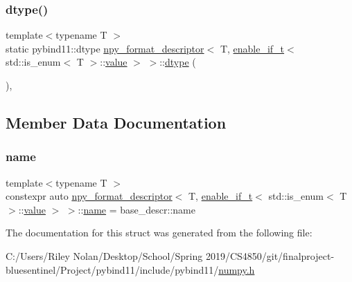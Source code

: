 \subsubsection{\texorpdfstring{dtype()}{dtype()}}
{\footnotesize\ttfamily template$<$typename T $>$ \\
static pybind11\+::dtype \mbox{\hyperlink{structnpy__format__descriptor}{npy\+\_\+format\+\_\+descriptor}}$<$ T, \mbox{\hyperlink{detail_2common_8h_a012819c9e8b5e04872a271f50f8b8196}{enable\+\_\+if\+\_\+t}}$<$ std\+::is\+\_\+enum$<$ T $>$\+::\mbox{\hyperlink{_s_d_l__opengl__glext_8h_a8ad81492d410ff2ac11f754f4042150f}{value}} $>$ $>$\+::\mbox{\hyperlink{classdtype}{dtype}} (\begin{DoxyParamCaption}{ }\end{DoxyParamCaption})\hspace{0.3cm}{\ttfamily [inline]}, {\ttfamily [static]}}



\subsection{Member Data Documentation}
\mbox{\label{structnpy__format__descriptor_3_01_t_00_01enable__if__t_3_01std_1_1is__enum_3_01_t_01_4_1_1value_01_4_01_4_a22bcbb11a0d4d204723ffdf2844b4b32}} 
\subsubsection{\texorpdfstring{name}{name}}
{\footnotesize\ttfamily template$<$typename T $>$ \\
constexpr auto \mbox{\hyperlink{structnpy__format__descriptor}{npy\+\_\+format\+\_\+descriptor}}$<$ T, \mbox{\hyperlink{detail_2common_8h_a012819c9e8b5e04872a271f50f8b8196}{enable\+\_\+if\+\_\+t}}$<$ std\+::is\+\_\+enum$<$ T $>$\+::\mbox{\hyperlink{_s_d_l__opengl__glext_8h_a8ad81492d410ff2ac11f754f4042150f}{value}} $>$ $>$\+::\mbox{\hyperlink{structname}{name}} = base\+\_\+descr\+::name\hspace{0.3cm}{\ttfamily [static]}}



The documentation for this struct was generated from the following file\+:\begin{DoxyCompactItemize}
\item 
C\+:/\+Users/\+Riley Nolan/\+Desktop/\+School/\+Spring 2019/\+C\+S4850/git/finalproject-\/bluesentinel/\+Project/pybind11/include/pybind11/\mbox{\hyperlink{numpy_8h}{numpy.\+h}}\end{DoxyCompactItemize}
